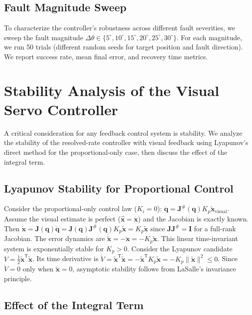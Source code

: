 \documentclass[12pt,a4paper,oneside]{report}
\begin{document}
\subsection{Fault Magnitude Sweep}

To characterize the controller's robustness across different fault severities, we sweep the fault magnitude $\Delta \theta \in \{5^\circ, 10^\circ, 15^\circ, 20^\circ, 25^\circ, 30^\circ\}$. For each magnitude, we run 50 trials (different random seeds for target position and fault direction). We report success rate, mean final error, and recovery time metrics.

\section{Stability Analysis of the Visual Servo Controller}

A critical consideration for any feedback control system is stability. We analyze the stability of the resolved-rate controller with visual feedback using Lyapunov's direct method for the proportional-only case, then discuss the effect of the integral term.

\subsection{Lyapunov Stability for Proportional Control}

Consider the proportional-only control law ($K_i = 0$): $\dot{\mathbf{q}} = \mathbf{J}^{\#}(\mathbf{q}) K_p \tilde{\mathbf{x}}_{\text{visual}}$. Assume the visual estimate is perfect ($\hat{\mathbf{x}} = \mathbf{x}$) and the Jacobian is exactly known. Then $\dot{\mathbf{x}} = \mathbf{J}(\mathbf{q}) \dot{\mathbf{q}} = \mathbf{J}(\mathbf{q}) \mathbf{J}^{\#}(\mathbf{q}) K_p \tilde{\mathbf{x}} = K_p \tilde{\mathbf{x}}$ since $\mathbf{J} \mathbf{J}^{\#} = \mathbf{I}$ for a full-rank Jacobian. The error dynamics are $\dot{\tilde{\mathbf{x}}} = -\dot{\mathbf{x}} = -K_p \tilde{\mathbf{x}}$. This linear time-invariant system is exponentially stable for $K_p > 0$. Consider the Lyapunov candidate $V = \frac{1}{2} \tilde{\mathbf{x}}^{\mathsf{T}} \tilde{\mathbf{x}}$. Its time derivative is $\dot{V} = \tilde{\mathbf{x}}^{\mathsf{T}} \dot{\tilde{\mathbf{x}}} = -\tilde{\mathbf{x}}^{\mathsf{T}} K_p \tilde{\mathbf{x}} = -K_p \|\tilde{\mathbf{x}}\|^2 \leq 0$. Since $\dot{V} = 0$ only when $\tilde{\mathbf{x}} = 0$, asymptotic stability follows from LaSalle's invariance principle.

\subsection{Effect of the Integral Term}
\end{document}

